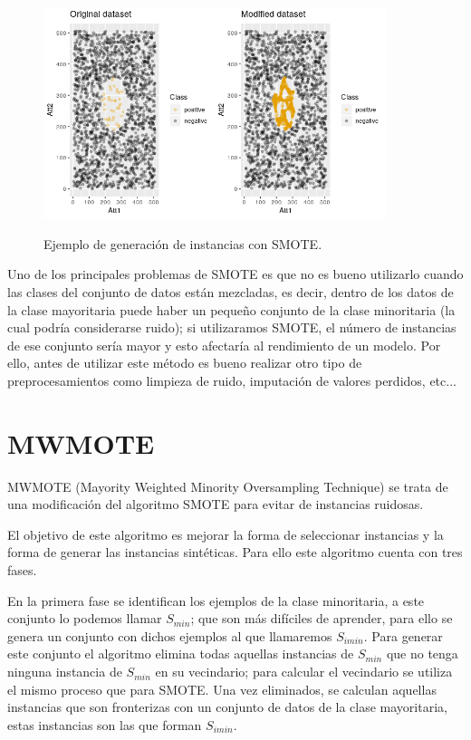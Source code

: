 \begin{figure}[h]
	\centering
	\includegraphics[width=100mm]{imagenes/SMOTE_comparison.png}
	\label{fig:12}
	\caption{Ejemplo de generación de instancias con SMOTE.}
\end{figure}
\verticalspace

Uno de los principales problemas de SMOTE es que no es bueno utilizarlo cuando las clases del conjunto de datos están mezcladas, es decir, dentro de los datos de la clase mayoritaria puede haber un pequeño conjunto de la clase minoritaria (la cual podría considerarse ruido); si utilizaramos SMOTE, el número de instancias de ese conjunto sería mayor y esto afectaría al rendimiento de un modelo. Por ello, antes de utilizar este método es bueno realizar otro tipo de preprocesamientos como limpieza de ruido, imputación de valores perdidos, etc...
\newpage
\section{MWMOTE}
MWMOTE (Mayority Weighted Minority Oversampling Technique) se trata de una modificación del algoritmo SMOTE para evitar de instancias ruidosas.\newline

El objetivo de este algoritmo es mejorar la forma de seleccionar instancias y la forma de generar las instancias sintéticas. Para ello este algoritmo cuenta con tres fases.\newline

En la primera fase se identifican los ejemplos de la clase minoritaria, a este conjunto lo podemos llamar $S_{min}$; que son más difíciles de aprender, para ello se genera un conjunto con dichos ejemplos al que llamaremos $S_{imin}$. Para generar este conjunto el algoritmo elimina todas aquellas instancias de $S_{min}$ que no tenga ninguna instancia de $S_{min}$ en su vecindario; para calcular el vecindario se utiliza el mismo proceso que para SMOTE. Una vez eliminados, se calculan aquellas instancias que son fronterizas con un conjunto de datos de la clase mayoritaria, estas instancias son las que forman $S_{imin}$.\newline

